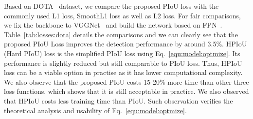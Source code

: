  Based on DOTA~\cite{Xia2018DAS} dataset, we compare the proposed PIoU loss with the commonly used L1 loss, SmoothL1 loss as well as L2 loss. For fair comparisons, we fix the backbone to VGGNet~\cite{Simonyan2014VDC} and build the network based on FPN~\cite{Lin2017FPN}. Table~\ref{tab:losses:dota} details the comparisons and we can clearly see that the proposed PIoU Loss improves the detection performance by around 3.5\%. HPIoU (Hard PIoU) loss is the simplified PIoU loss using Eq.~\ref{equ:model:optmize}. Its performance is slightly reduced but still comparable to PIoU loss. Thus, HPIoU loss can be a viable option in practise as it has lower computational complexity. We also observe that the proposed PIoU costs 15-20\% more time than other three loss functions, which shows that it is still acceptable in practice. We also observed that HPIoU costs less training time than PIoU. Such observation verifies the theoretical analysis and usability of Eq.~\ref{equ:model:optmize}.

